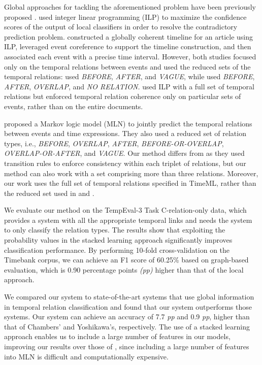 \documentclass[english]{jnlp_1.4}
\begin{document}
Global approaches for tackling the aforementioned problem have been previously proposed \cite{chambers2008,yoshikawa2009,denis2011predicting,do2012joint}.
 used integer linear programming (ILP) to maximize the confidence scores of the output of local classifiers in order to resolve the contradictory prediction problem.
 constructed a globally coherent timeline for an article using ILP, leveraged event coreference to support the timeline construction, and then associated each event with a precise time interval.
However, both studies focused only on the temporal relations between events and used the reduced sets of the temporal relations:  used \emph{\footnotesize BEFORE}, \emph{\footnotesize AFTER}, and \emph{\footnotesize VAGUE}, while  used \emph{\footnotesize BEFORE}, \emph{\footnotesize AFTER}, \emph{\footnotesize OVERLAP}, and \emph{\footnotesize NO RELATION.}
 used ILP with a full set of temporal relations but enforced temporal relation coherence only on particular sets of events, rather than on the entire documents. 

 proposed a Markov logic model (MLN) to jointly predict the temporal relations between events and time expressions. 
They also used a reduced set of relation types, i.e., \emph{\footnotesize BEFORE}, \emph{\footnotesize OVERLAP}, \emph{\footnotesize AFTER}, \emph{\footnotesize BEFORE-OR-OVERLAP}, \emph{\footnotesize OVERLAP-OR-AFTER}, and \emph{\footnotesize VAGUE}.
Our method differs from  as they used transition rules to enforce consistency within each triplet of relations, but our method can also work with a set comprising more than three relations.
Moreover, our work uses the full set of temporal relations specified in TimeML, rather than the reduced set used in  and .

We evaluate our method on the TempEval-3 Task C-relation-only data, which provides a system with all the appropriate temporal links and needs the system to only classify the relation types.
The results show that exploiting the probability values in the stacked learning approach significantly improves classification performance.
By performing 10-fold cross-validation on the Timebank corpus, we can achieve an F1 score of 60.25\% based on graph-based evaluation, which is 0.90 percentage points \textit{(pp)} higher than that of the local approach. 

We compared our system to state-of-the-art systems that use global information in temporal relation classification and found that our system outperforms those systems. 
Our system can achieve an accuracy of 7.7 \textit{pp} and 0.9 \textit{pp}, higher than that of Chambers' and Yoshikawa's, respectively. 
The use of a stacked learning approach enables us to include a large number of features in our models, improving our results over those of , since including a large number of features into MLN is difficult and computationally expensive.
\end{document}
